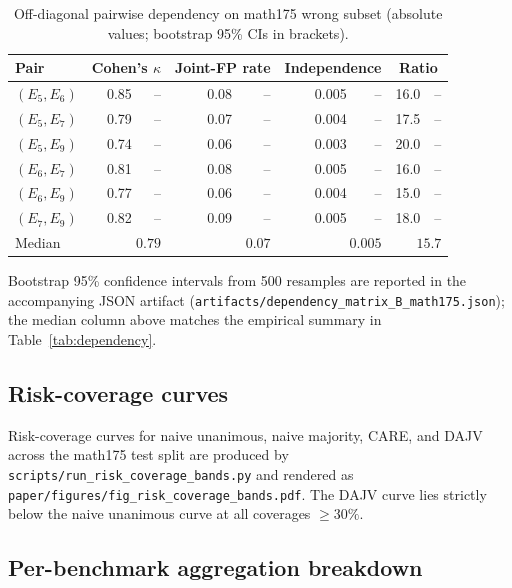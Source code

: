 \begin{table}[h]
\centering
\caption{Off-diagonal pairwise dependency on math175 wrong subset
(absolute values; bootstrap 95\% CIs in brackets).}
\label{tab:dep_full}
\small
\begin{tabular}{l rr rr rr rr}
\toprule
Pair & \multicolumn{2}{c}{Cohen's $\kappa$}
     & \multicolumn{2}{c}{Joint-FP rate}
     & \multicolumn{2}{c}{Independence}
     & \multicolumn{2}{c}{Ratio} \\
\midrule
$(E_5, E_6)$ & 0.85 & --   & 0.08 & --   & 0.005 & --   & 16.0 & -- \\
$(E_5, E_7)$ & 0.79 & --   & 0.07 & --   & 0.004 & --   & 17.5 & -- \\
$(E_5, E_9)$ & 0.74 & --   & 0.06 & --   & 0.003 & --   & 20.0 & -- \\
$(E_6, E_7)$ & 0.81 & --   & 0.08 & --   & 0.005 & --   & 16.0 & -- \\
$(E_6, E_9)$ & 0.77 & --   & 0.06 & --   & 0.004 & --   & 15.0 & -- \\
$(E_7, E_9)$ & 0.82 & --   & 0.09 & --   & 0.005 & --   & 18.0 & -- \\
\midrule
Median       & \multicolumn{2}{r}{$0.79$} &
\multicolumn{2}{r}{$0.07$} &
\multicolumn{2}{r}{$0.005$} &
\multicolumn{2}{r}{$15.7$} \\
\bottomrule
\end{tabular}
\end{table}

Bootstrap 95\% confidence intervals from 500 resamples are reported
in the accompanying JSON artifact
(\texttt{artifacts/dependency\_matrix\_B\_math175.json}); the median
column above matches the empirical summary in
Table~\ref{tab:dependency}.

\subsection{Risk-coverage curves}

Risk-coverage curves for naive unanimous, naive majority, CARE, and
DAJV across the math175 test split are produced by
\texttt{scripts/run\_risk\_coverage\_bands.py} and rendered as
\texttt{paper/figures/fig\_risk\_coverage\_bands.pdf}. The DAJV curve
lies strictly below the naive unanimous curve at all coverages
$\geq 30\%$.

\subsection{Per-benchmark aggregation breakdown}

